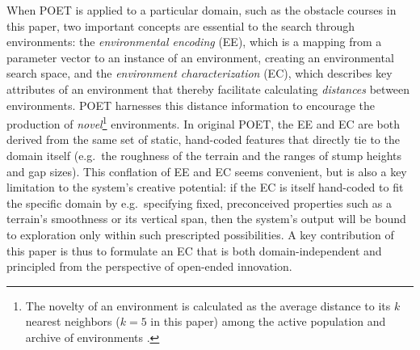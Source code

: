 \documentclass{article}
\begin{document}

When POET is applied to a particular domain, such as the obstacle courses in this paper, two important concepts are essential to the search through environments: the \emph{environmental encoding} (EE), which is a mapping from a parameter vector to an instance of an environment, creating an environmental search space, and the \emph{environment characterization} (EC), which describes key attributes of an environment that thereby facilitate calculating \emph{distances} between environments. POET harnesses this distance information to encourage the production of \emph{novel}\footnote{The novelty of an environment is calculated as the average distance to its $k$ nearest neighbors ($k = 5$ in this paper) among the active population and archive of environments \cite{lehman2011abandoning,wang2019paired,wang2019poetGECCO}.} environments. In original POET, the EE and EC are both derived from the same set of static, hand-coded features that directly tie to the domain itself (e.g.\ the roughness of the terrain and the ranges of stump heights and gap sizes). This conflation of EE and EC seems convenient, but is also a key limitation to the system's creative potential: if the EC is itself hand-coded to fit the specific domain by e.g.\ specifying fixed, preconceived properties such as a terrain's smoothness or its vertical span, then the system's output will be bound to exploration only within such prescripted possibilities. A key contribution of this paper is thus to formulate an EC that is both domain-independent and principled from the perspective of open-ended innovation.
\end{document}
